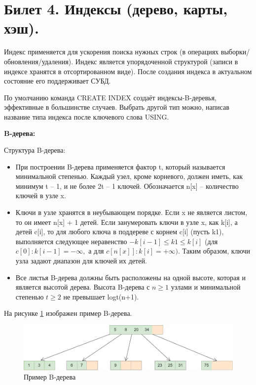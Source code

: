 \newpage
\section {Билет 4. Индексы (дерево, карты, хэш).}

Индекс применяется для ускорения поиска нужных строк (в операциях
выборки/обновления/удаления). Индекс является упорядоченной структурой (записи в индексе хранятся в отсортированном виде). После создания индекса в актуальном состояние его поддерживает СУБД.

По умолчанию команда CREATE INDEX создаёт индексы-B-деревья, эффективные в большинстве случаев. Выбрать другой тип можно, написав название типа индекса после ключевого слова USING. 

\textbf{B-дерева:} 

Структура B-дерева: 
\begin{itemize}
    \item При построении B-дерева применяется фактор t, который называется минимальной степенью. Каждый узел, кроме корневого, должен иметь, как минимум t – 1, и не более 2t – 1 ключей. Обозначается n[x] – количество ключей в узле x.
    \item Ключи в узле хранятся в неубывающем порядке. Если x не является листом, то он имеет n[x] + 1 детей. Если занумеровать ключи в узле x, как k[i], а детей c[i], то для любого ключа в поддереве с корнем c[i] (пусть k1), выполняется следующее неравенство $-k[i-1] \leq k1 \leq k[i]$ (для $c[0]: k[i-1] = -\infty,$ а для $c[n[x]]: k[i] = +\infty)$. Таким образом, ключи узла задают диапазон для ключей их детей.
    \item Все листья B-дерева должны быть расположены на одной высоте, которая и является высотой дерева. Высота B-дерева с $n \geq 1$ узлами и минимальной степенью $t\geq 2$ не превышает logt(n+1).
\end{itemize}

На рисунке \ref{fig:tree} изображен пример B-дерева. 

\begin{figure}[!h]
    \centering
    \includegraphics[scale = 0.5]{4/tree.jpg}
    \caption{Пример B-дерева}
    \label{fig:tree}
\end{figure}


